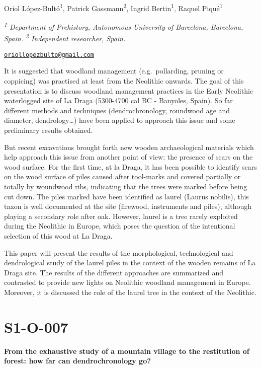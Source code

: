 \documentclass[
]{book}
\begin{document}
Oriol López-Bultó\textsuperscript{1}, Patrick Gassmann\textsuperscript{2}, Ingrid Bertin\textsuperscript{1}, Raquel Piqué\textsuperscript{1}

\emph{\textsuperscript{1} Department of Prehistory, Autonomous University of Barcelona, Barcelona, Spain. \textsuperscript{2} Independent researcher, Spain.}

\href{mailto:oriollopezbulto@gmail.com}{\nolinkurl{oriollopezbulto@gmail.com}}

It is suggested that woodland management (e.g.~pollarding, pruning or coppicing) was practised at least from the Neolithic onwards. The goal of this presentation is to discuss woodland management practices in the Early Neolithic waterlogged site of La Draga (5300-4700 cal BC - Banyoles, Spain). So far different methods and techniques (dendrochronology, roundwood age and diameter, dendrology\ldots) have been applied to approach this issue and some preliminary results obtained.

But recent excavations brought forth new wooden archaeological materials which help approach this issue from another point of view: the presence of scars on the wood surface. For the first time, at la Draga, it has been possible to identify scars on the wood surface of piles caused after tool-marks and covered partially or totally by woundwood ribs, indicating that the trees were marked before being cut down. The piles marked have been identified as laurel (Laurus nobilis), this taxon is well documented at the site (firewood, instruments and piles), although playing a secondary role after oak. However, laurel is a tree rarely exploited during the Neolithic in Europe, which poses the question of the intentional selection of this wood at La Draga.

This paper will present the results of the morphological, technological and dendrological study of the laurel piles in the context of the wooden remains of La Draga site. The results of the different approaches are summarized and contrasted to provide new lights on Neolithic woodland management in Europe. Moreover, it is discussed the role of the laurel tree in the context of the Neolithic.

\hypertarget{s1-o-007}{%
\section*{S1-O-007}\label{s1-o-007}}

\textbf{From the exhaustive study of a mountain village to the restitution of forest: how far can dendrochronology go?}
\end{document}
